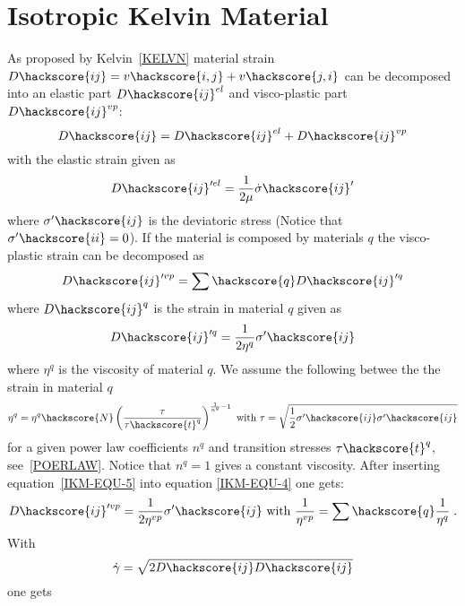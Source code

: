 \section{Isotropic Kelvin Material \label{IKM}}
As proposed by Kelvin~\ref{KELVN} material strain $D\hackscore{ij}=v\hackscore{i,j}+v\hackscore{j,i}$ can be decomposed into
an elastic part $D\hackscore{ij}^{el}$ and visco-plastic part $D\hackscore{ij}^{vp}$:
\begin{equation}\label{IKM-EQU-2}
D\hackscore{ij}=D\hackscore{ij}^{el}+D\hackscore{ij}^{vp}
\end{equation}
with the elastic strain given as 
\begin{equation}\label{IKM-EQU-3}
D\hackscore{ij}'^{el}=\frac{1}{2 \mu} \dot{\sigma}\hackscore{ij}'
\end{equation}
where $\sigma'\hackscore{ij}$ is the deviatoric stress (Notice that $\sigma'\hackscore{ii}=0$).
If the material is composed by materials $q$ the visco-plastic strain can be decomposed as
\begin{equation}\label{IKM-EQU-4}
D\hackscore{ij}'^{vp}=\sum\hackscore{q} D\hackscore{ij}'^{q} 
\end{equation}
where $D\hackscore{ij}^{q}$ is the strain in material $q$ given as 
\begin{equation}\label{IKM-EQU-5}
D\hackscore{ij}'^{q}=\frac{1}{2 \eta^{q}} \sigma'\hackscore{ij} 
\end{equation}
where $\eta^{q}$ is the viscosity of material $q$. We assume the following 
betwee the the strain in material $q$ 
\begin{equation}\label{IKM-EQU-5b}
\eta^{q}=\eta^{q}\hackscore{N} \left(\frac{\tau}{\tau\hackscore{t}^q}\right)^{\frac{1}{n^{q}}-1}
\mbox{ with } \tau=\sqrt{\frac{1}{2}\sigma'\hackscore{ij} \sigma'\hackscore{ij}}
\end{equation}
for a given power law coefficients $n^{q}$ and transition stresses $\tau\hackscore{t}^q$, see~\ref{POERLAW}.
Notice that $n^{q}=1$ gives a constant viscosity.
After inserting equation~\ref{IKM-EQU-5} into equation \ref{IKM-EQU-4} one gets:
\begin{equation}\label{IKM-EQU-6}
D\hackscore{ij}'^{vp}=\frac{1}{2 \eta^{vp}} \sigma'\hackscore{ij} \mbox{ with } \frac{1}{\eta^{vp}} = \sum\hackscore{q} \frac{1}{\eta^{q}} \;.
\end{equation}
With
\begin{equation}\label{IKM-EQU-8}
\dot{\gamma}=\sqrt{2 D\hackscore{ij} D\hackscore{ij}}
\end{equation}
one gets 
